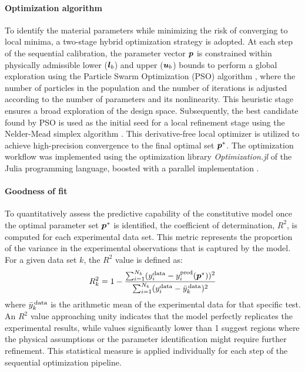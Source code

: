 \paragraph{Optimization algorithm}
To identify the material parameters while minimizing the risk of converging to local minima, a two-stage hybrid optimization strategy is adopted. At each step of the sequential calibration, the parameter vector $\boldsymbol{p}$ is constrained within physically admissible lower ($\boldsymbol{l}_b$) and upper ($\boldsymbol{u}_b$) bounds to perform a global exploration using the Particle Swarm Optimization (PSO) algorithm \cite{PSO_Kennedy_Eberhart_1995}, where the number of particles in the population and the number of iterations is adjusted according to the number of parameters and its nonlinearity. This heuristic stage ensures a broad exploration of the design space. Subsequently, the best candidate found by PSO is used as the initial seed for a local refinement stage using the Nelder-Mead simplex algorithm \cite{NelderMead1965}. This derivative-free local optimizer is utilized to achieve high-precision convergence to the final optimal set $\boldsymbol{p}^*$. The optimization workflow was implemented using the optimization library \emph{Optimization.jl} \cite{optimizationjl} of the Julia programming language, boosted with a parallel implementation \cite{utkarsh2024efficient}.


\paragraph{Goodness of fit}
To quantitatively assess the predictive capability of the constitutive model once the optimal parameter set $\boldsymbol{p}^*$ is identified, the coefficient of determination, $R^2$, is computed for each experimental data set. This metric represents the proportion of the variance in the experimental observations that is captured by the model. For a given data set $k$, the $R^2$ value is defined as:
\begin{equation}
R^2_k = 1 - \frac{\sum_{i=1}^{N_k} (y_i^\text{data} - y_i^\text{pred}(\boldsymbol{p}^*))^2}{\sum_{i=1}^{N_k} (y_i^\text{data} - \bar{y}_k^\text{\,data})^2}
\end{equation}
where $\bar{y}_k^\text{\,data}$ is the arithmetic mean of the experimental data for that specific test. An $R^2$ value approaching unity indicates that the model perfectly replicates the experimental results, while values significantly lower than 1 suggest regions where the physical assumptions or the parameter identification might require further refinement. This statistical measure is applied individually for each step of the sequential optimization pipeline.


